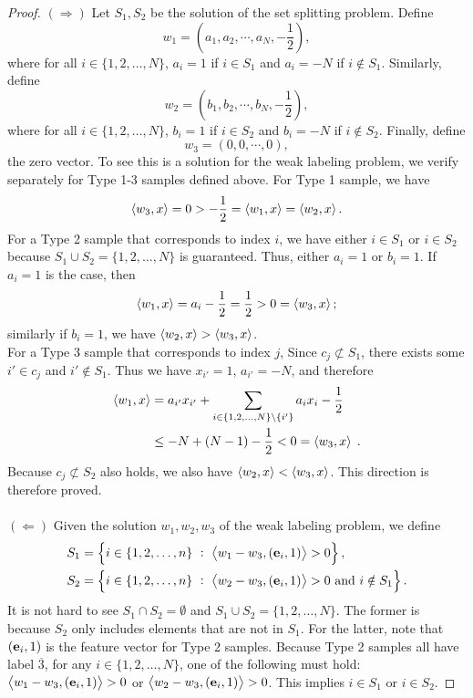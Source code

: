 \begin{proof}
$(\Longrightarrow)$ Let $S_1, S_2$ be the solution of the set splitting problem. Define
$$
w_1 = \left(a_1, a_2, \cdots, a_N, -\frac{1}{2}\right),
$$
where for all $i \in \{1,2,\dots,N\}$, $a_i=1$ if $i\in S_1$ and $a_i=-N$ if
$i\notin S_1$. Similarly, define
$$
w_2 = \left(b_1, b_2, \cdots, b_N, -\frac{1}{2}\right),
$$
where for all $i \in \{1,2,\dots,N\}$, $b_i=1$ if $i \in S_2$ and $b_i=-N$ if
$i\notin S_2$. Finally, define
$$
w_3 = (0,0,\cdots, 0),
$$
the zero vector. To see this is a solution for the weak labeling problem, we
verify separately for Type 1-3 samples defined above. For Type 1 sample, we have
$$
\left\langle w_3, x \right\rangle = 0 > -\frac{1}{2} = \left\langle w_1, x \right\rangle=\left\langle w_2, x \right\rangle.
$$
For a Type 2 sample that corresponds to index $i$, we have either $i\in S_1$ or
$i\in S_2$ because $S_1\cup S_2 = \{1,2,\dots,N\}$ is guaranteed. Thus, either
$a_i=1$ or $b_i=1$. If $a_i=1$ is the case, then
$$
\left\langle w_1, x \right\rangle = a_i - \frac{1}{2} = \frac{1}{2} > 0 = \left\langle w_3, x \right\rangle;
$$
similarly if $b_i=1$, we have $\left\langle w_2, x \right\rangle>\left\langle w_3, x \right\rangle$. \\ For a Type 3 sample
that corresponds to index $j$, Since $c_j \not\subset S_1$, there exists some
$i'\in c_j$ and $i'\notin S_1$. Thus we have $x_{i'}=1$, $a_{i'}=-N$, and
therefore
\begin{align*}
\left\langle w_1, x \right\rangle
& = a_{i'}x_{i'} + \sum_{i\in \{1,2,\dots,N\} \setminus \{i'\}} a_ix_i - \frac{1}{2} \\
& \le -N + (N-1)-\frac{1}{2} < 0 = \left\langle w_3, x \right\rangle \; .
\end{align*}
Because $c_j \not\subset S_2$ also holds, we also have
$\left\langle w_2, x \right\rangle<\left\langle w_3, x \right\rangle$. This direction is therefore proved. \\
\ \\
$(\Longleftarrow)$ Given the solution $w_1, w_2, w_3$ of the weak labeling problem, we define
\begin{align*}
S_1 &= \left\{i \in \{1,2,\dots,n\} ~:~ \left\langle w_1-w_3, (\mathbf{e}_i, 1) \right\rangle > 0 \right\}, \\
S_2 &= \left\{i \in \{1,2,\dots,n\} ~:~ \left\langle w_2-w_3, (\mathbf{e}_i, 1) \right\rangle > 0 \text{\ and\ } i \notin S_1 \right\}.
\end{align*}
It is not hard to see $S_1 \cap S_2 = \emptyset$ and $S_1\cup S_2 =
\{1,2,\dots,N\}$. The former is because $S_2$ only includes elements that are
not in $S_1$. For the latter, note that $(\mathbf{e}_i, 1)$ is the feature vector for
Type 2 samples. Because Type 2 samples all have label $\overline{3}$, for any $i
\in \{1,2,\dots,N\}$, one of the following must hold: $\left\langle w_1-w_3, (\mathbf{e}_i,
1) \right\rangle>0$ or $\left\langle w_2-w_3, (\mathbf{e}_i, 1) \right\rangle>0$. This implies $i\in S_1$ or $i\in S_2$.


\end{proof}
